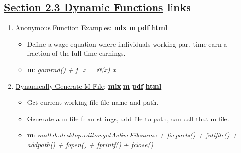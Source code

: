 \documentclass[
]{book}
\providecommand{\tightlist}{%
  \setlength{\itemsep}{0pt}\setlength{\parskip}{0pt}}
\begin{document}
\hypertarget{section-2.3-dynamic-functionsdynamic-functions-links}{%
\subsection{\texorpdfstring{\protect\hyperlink{dynamic-functions}{Section 2.3 Dynamic Functions} links}{Section 2.3 Dynamic Functions links}}\label{section-2.3-dynamic-functionsdynamic-functions-links}}

\begin{enumerate}
\def\labelenumi{\arabic{enumi}.}
\tightlist
\item
  \href{https://fanwangecon.github.io/M4Econ/function/anonymous/htmlpdfm/fs_anonymous_func.html}{Anonymous Function Examples}: \href{https://github.com/FanWangEcon/M4Econ/blob/master/function/anonymous/fs_anonymous_func.mlx}{\textbf{mlx}} \textbar{} \href{https://github.com/FanWangEcon/M4Econ/blob/master/function/anonymous/htmlpdfm/fs_anonymous_func.m}{\textbf{m}} \textbar{} \href{https://github.com/FanWangEcon/M4Econ/blob/master/function/anonymous/htmlpdfm/fs_anonymous_func.pdf}{\textbf{pdf}} \textbar{} \href{https://fanwangecon.github.io/M4Econ/function/anonymous/htmlpdfm/fs_anonymous_func.html}{\textbf{html}}

  \begin{itemize}
  \tightlist
  \item
    Define a wage equation where individuals working part time earn a fraction of the full time earnings.
  \item
    \textbf{m}: \emph{gamrnd() + f\_x = @(x) x}
  \end{itemize}
\item
  \href{https://fanwangecon.github.io/M4Econ/function/anonymous/htmlpdfm/fs_dyna_generate_func.html}{Dynamically Generate M File}: \href{https://github.com/FanWangEcon/M4Econ/blob/master/function/anonymous/fs_dyna_generate_func.mlx}{\textbf{mlx}} \textbar{} \href{https://github.com/FanWangEcon/M4Econ/blob/master/function/anonymous/htmlpdfm/fs_dyna_generate_func.m}{\textbf{m}} \textbar{} \href{https://github.com/FanWangEcon/M4Econ/blob/master/function/anonymous/htmlpdfm/fs_dyna_generate_func.pdf}{\textbf{pdf}} \textbar{} \href{https://fanwangecon.github.io/M4Econ/function/anonymous/htmlpdfm/fs_dyna_generate_func.html}{\textbf{html}}

  \begin{itemize}
  \tightlist
  \item
    Get current working file file name and path.
  \item
    Generate a m file from strings, add file to path, can call that m file.
  \item
    \textbf{m}: \emph{matlab.desktop.editor.getActiveFilename + fileparts() + fullfile() + addpath() + fopen() + fprintf() + fclose()}
  \end{itemize}
\end{enumerate}
\end{document}
